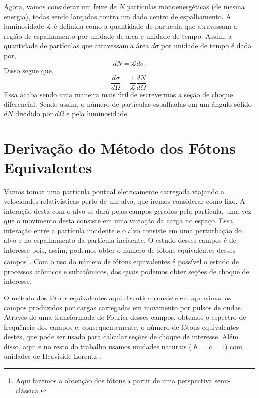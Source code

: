 Agora, vamos considerar um feixe de $N$ partículas monoenergéticas (de mesma
energia), todas sendo lançadas contra um dado centro de espalhamento. A
luminosidade $\mathcal{L}$ é definida como a quantidade de partícula que
atravessam a região de espalhamento por unidade de área e unidade de tempo.
Assim, a quantidade de partículas que atravessam a área $d\sigma$ por unidade
de tempo é dada por,
\begin{equation}
	dN = \mathcal{L} d\sigma.
\end{equation}
Disso segue que,
\begin{equation}
	\frac{d\sigma}{d\Omega} = \frac{1}{\mathcal{L}} \frac{dN}{d\Omega}.
\end{equation}
Essa acaba sendo uma maneira mais útil de escrevermos a seção de choque
diferencial. Sendo assim, o número de partículas espalhadas em um ângulo sólido
$dN$ dividido por $d\Omega$ e pela luminosidade.


\section{Derivação do Método dos Fótons Equivalentes}

Vamos tomar uma partícula pontual eletricamente carregada viajando a
velocidades relativísticas perto de um alvo, que iremos considerar como fixo. A
interação desta com o alvo se dará pelos campos gerados pela partícula, uma vez
que o movimento desta consiste em uma variação da carga no espaço. Essa
interação entre a partícula incidente e o alvo consiste em uma perturbação do
alvo e no espalhamento da partícula incidente.  O estudo desses campos é de
interesse pois, assim, podemos obter o número de fótons equivalentes desses
campos\footnote{Aqui fazemos a obtenção dos fótons a partir de uma perspectiva
semi-clássica.}. Com o uso do número de fótons equivalentes é possível o estudo
de processos atômicos e subatômicos, dos quais podemos obter seções de choque
de interesse.

O método dos fótons equivalentes aqui discutido consiste em aproximar os campos
produzidos por cargas carregadas em movimento por pulsos de ondas.  Através de
uma transformada de Fourier desses campos, obtemos o espectro de frequência dos
campos e, consequentemente, o número de fótons equivalentes destes, que pode
ser usado para calcular seções de choque de interesse.  Além disso, aqui e no
resto do trabalho usamos unidades naturais ($\hslash = c = 1$) com unidades de
Heaviside-Lorentz \cite{jackson3} \cite{mariola} \cite{caruso_quanta}
\cite{nivaldo_cap6}.

